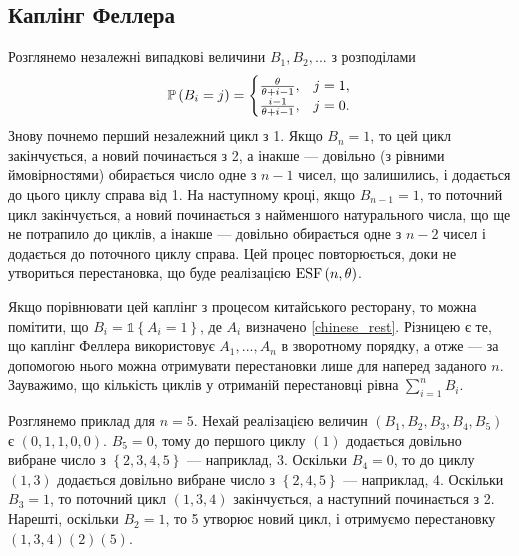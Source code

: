\subsection{Каплінг Феллера}
Розглянемо  незалежні випадкові величини
$B_1, B_2, ...$ з розподілами
\begin{gather}
    \P{B_i = j} = \begin{cases}
        \frac{\theta}{\theta + i - 1}, & j = 1, \\
        \frac{i - 1}{\theta + i - 1}, & j = 0.
    \end{cases}
\end{gather}
Знову почнемо перший незалежний цикл з 1. Якщо $B_n = 1$,
то цей цикл закінчується, а новий починається з 2, а інакше ---
довільно (з рівними ймовірностями) обирається число одне з $n-1$ чисел,
що залишились, і додається до цього циклу справа від 1.
На наступному кроці, якщо $B_{n-1} = 1$, то поточний цикл
закінчується, а новий починається з найменшого
натурального числа, що ще не потрапило до циклів, а інакше ---
довільно обирається одне з $n-2$ чисел і додається до поточного циклу справа.
Цей процес повторюється, доки не утвориться перестановка,
що буде реалізацією $\ESF{n, \theta}$.

Якщо порівнювати цей каплінг з процесом китайського ресторану,
то можна помітити, що $B_i = \mathds{1}\left\{A_i = 1\right\}$, де
$A_i$ визначено \eqref{chinese_rest}. Різницею є те, що
каплінг Феллера використовує $A_1,...,A_n$ в зворотному порядку, 
а отже --- за допомогою нього можна отримувати 
перестановки лише для наперед заданого $n$. Зауважимо, що кількість
циклів у отриманій перестановці рівна $\sum_{i=1}^n B_i$. 

Розглянемо приклад для $n = 5$. Нехай реалізацією величин $(B_1, B_2, B_3, B_4, B_5)$ є
$(0, 1, 1, 0, 0)$. $B_5 = 0$, тому до першого циклу $(1)$ додається довільно вибране
число з $\left\{2,3,4,5\right\}$ --- наприклад, $3$. Оскільки $B_4 = 0$, то до циклу
$(1, 3)$ додається довільно вибране число з $\left\{2, 4, 5\right\}$ --- наприклад, 4.
Оскільки $B_3 = 1$, то поточний цикл $(1, 3, 4)$ закінчується, а наступний починається з 2.
Нарешті, оскільки $B_2 = 1$, то 5 утворює новий цикл, і отримуємо
перестановку $(1, 3, 4) (2) (5)$.